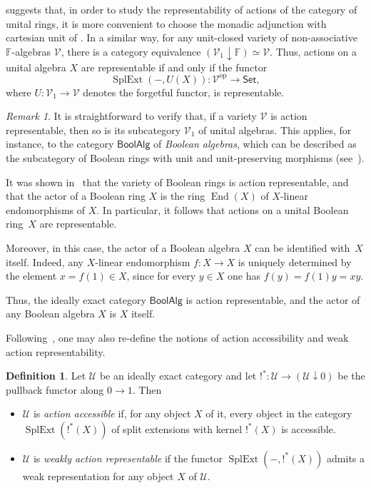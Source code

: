 \documentclass[reqno,a4paper]{amsart}
\theoremstyle{plain}
\theoremstyle{definition}
\newtheorem{definition}[subsection]{Definition}
\theoremstyle{remark}
\newtheorem{remark}[subsection]{Remark}
\numberwithin{equation}{section}
\newcommand{\F}{\mathbb{F}}
\newcommand{\V}{\mathcal{V}}
\newcommand{\U}{\mathcal{U}}
\DeclareMathOperator{\op}{op}
\DeclareMathOperator{\SplExt}{SplExt}
\DeclareMathOperator{\End}{End}
\newcommand{\Set}{\ensuremath{\mathsf{Set}}}
\newcommand{\BoolAlg}{\ensuremath{\mathsf{BoolAlg}}}
\begin{document}
 suggests that, in order to study the representability of actions of the category of unital rings, it is more convenient to choose the monadic adjunction with cartesian unit of .  In a similar way, for any unit-closed variety of non-associative $\F$-algebras $\V$, there is a category equivalence $(\V_1 \downarrow \F) \simeq \V$. Thus, actions on a unital algebra $X$ are representable if and only if the functor
\[
\SplExt(-,U(X)) \colon \V^{\op} \to \Set,
\]
where $U \colon \V_1 \to \V$ denotes the forgetful functor, is representable.

\begin{remark}
It is straightforward to verify that, if a variety $\V$ is action representable, then so is its subcategory $\V_1$ of unital algebras. This applies, for instance, to the category $\BoolAlg$ of \emph{Boolean algebras}, which can be described as the subcategory of Boolean rings with unit and unit-preserving morphisms (see~\cite{Bell}).

It was shown in~\cite[Proposition~3.1]{BJK2} that the variety of Boolean rings is action representable, and that the actor of a Boolean ring $X$ is the ring $\End(X)$ of $X$-linear endomorphisms of $X$. In particular, it follows that actions on a unital Boolean ring~$X$ are representable.

Moreover, in this case, the actor of a Boolean algebra $X$ can be identified with~$X$ itself. Indeed, any $X$-linear endomorphism $f \colon X \to X$ is uniquely determined by the element $x = f(1) \in X$, since for every $y \in X$ one has $f(y) = f(1)y = xy$.

Thus, the ideally exact category $\BoolAlg$ is action representable, and the actor of any Boolean algebra $X$ is $X$ itself.
\end{remark}

Following~\cite{IdeallyExact}, one may also re-define the notions of action accessibility and weak action representability.

\begin{definition}\label{act_acc}
Let $\U$ be an ideally exact category and let $!^* \colon \U \to (\U \downarrow 0)$ be the pullback functor along $0 \to 1$. Then
\begin{itemize}
\item $\U$ is \emph{action accessible} if, for any object $X$ of it, every object in the category $\SplExt(!^*(X))$ of split extensions with kernel $!^*(X)$ is accessible.
\item $\U$ is \emph{weakly action representable} if the functor $\SplExt(-,!^*(X))$ admits a weak representation for any object $X$ of $\U$.
\end{itemize}
\end{definition}
\end{document}
